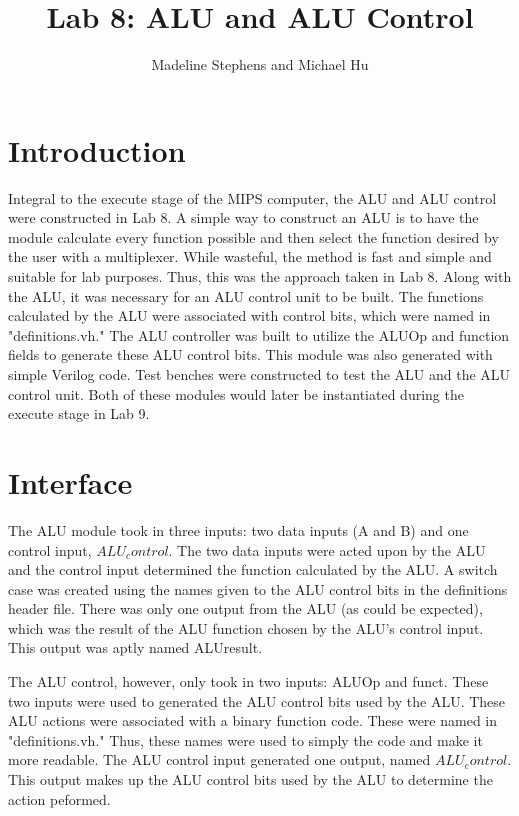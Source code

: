 \documentclass{article}
\author{Madeline Stephens and Michael Hu}
\title{Lab 8: ALU and ALU Control}
\begin{document}
\maketitle

\section{Introduction}

Integral to the execute stage of the MIPS computer, the ALU and ALU control were constructed in Lab 8. A simple way to construct an ALU is to have the module calculate every function possible and then select the function desired by the user with a multiplexer. While wasteful, the method is fast and simple and suitable for lab purposes. Thus, this was the approach taken in Lab 8. Along with the ALU, it was necessary for an ALU control unit to be built. The functions calculated by the ALU were associated with control bits, which were named in "definitions.vh." The ALU controller was built to utilize the ALUOp and function fields to generate these ALU control bits. This module was also generated with simple Verilog code. Test benches were constructed to test the ALU and the ALU control unit. Both of these modules would later be instantiated during the execute stage in Lab 9.


\section{Interface}
The ALU module took in three inputs: two data inputs (A and B) and one control input, $ALU_control$. The two data inputs were acted upon by the ALU and the control input determined the function calculated by the ALU.  A switch case was created using the names given to the ALU control bits in the definitions header file. There was only one output from the ALU (as could be expected), which was the result of the ALU function chosen by the ALU's control input. This output was aptly named ALUresult. 

The ALU control, however, only took in two inputs: ALUOp and funct. These two inputs were used to generated the ALU control bits used by the ALU. These ALU actions were associated with a binary function code. These were named in "definitions.vh." Thus, these names were used to simply the code and make it more readable. The ALU control input generated one output, named $ALU_control$. This output makes up the ALU control bits used by the ALU to determine the action peformed.
\end{document}
